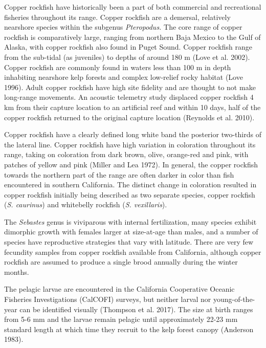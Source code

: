 \documentclass[11pt,
  english,
  letterpaper,
]{article}
\begin{document}
Copper rockfish have historically been a part of both commercial and recreational fisheries throughout its range. Copper rockfish are a demersal, relatively nearshore species within the subgenus \emph{Pteropodus.} The core range of copper rockfish is comparatively large, ranging from northern Baja Mexico to the Gulf of Alaska, with copper rockfish also found in Puget Sound. Copper rockfish range from the sub-tidal (as juveniles) to depths of around 180 m (Love et al. 2002). Copper rockfish are commonly found in waters less than 100 m in depth inhabiting nearshore kelp forests and complex low-relief rocky habitat (Love 1996). Adult copper rockfish have high site fidelity and are thought to not make long-range movements. An acoustic telemetry study displaced copper rockfish 4 km from their capture location to an artificial reef and within 10 days, half of the copper rockfish returned to the original capture location (Reynolds et al. 2010).

Copper rockfish have a clearly defined long white band the posterior two-thirds of the lateral line. Copper rockfish have high variation in coloration throughout its range, taking on coloration from dark brown, olive, orange-red and pink, with patches of yellow and pink (Miller and Lea 1972). In general, the copper rockfish towards the northern part of the range are often darker in color than fish encountered in southern California. The distinct change in coloration resulted in copper rockfish initially being described as two separate species, copper rockfish (\emph{S. caurinus}) and whitebelly rockfish (\emph{S. vexillaris}).

The \emph{Sebastes} genus is viviparous with internal fertilization, many species exhibit dimorphic growth with females larger at size-at-age than males, and a number of species have reproductive strategies that vary with latitude. There are very few fecundity samples from copper rockfish available from California, although copper rockfish are assumed to produce a single brood annually during the winter months.

The pelagic larvae are encountered in the California Cooperative Oceanic Fisheries Investigations (CalCOFI) surveys, but neither larval nor young-of-the-year can be identified visually (Thompson et al. 2017). The size at birth ranges from 5-6 mm and the larvae remain pelagic until approximately 22-23 mm standard length at which time they recruit to the kelp forest canopy (Anderson 1983).
\end{document}
